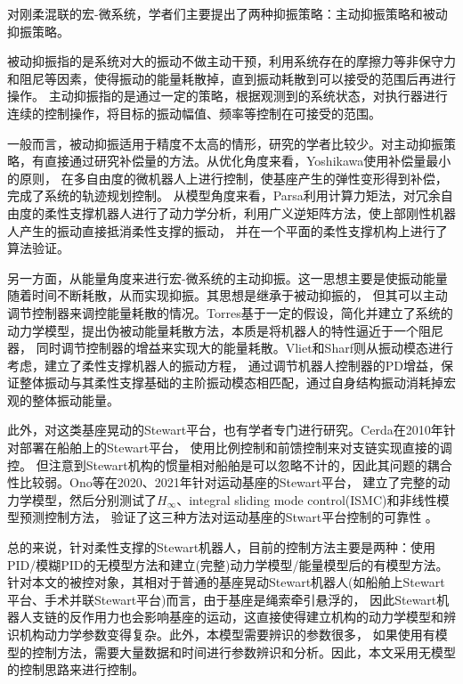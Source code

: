对刚柔混联的宏-微系统，学者们主要提出了两种抑振策略：主动抑振策略和被动抑振策略。

被动抑振指的是系统对大的振动不做主动干预，利用系统存在的摩擦力等非保守力和阻尼等因素，使得振动的能量耗散掉，直到振动耗散到可以接受的范围后再进行操作。
主动抑振指的是通过一定的策略，根据观测到的系统状态，对执行器进行连续的控制操作，将目标的振动幅值、频率等控制在可接受的范围。

一般而言，被动抑振适用于精度不太高的情形，研究的学者比较少。对主动抑振策略，有直接通过研究补偿量的方法。从优化角度来看，Yoshikawa使用补偿量最小的原则，
在多自由度的微机器人上进行控制，使基座产生的弹性变形得到补偿，完成了系统的轨迹规划控制\cite{yoshikawaQuasistaticTrajectoryTracking1993}。
从模型角度来看，Parsa利用计算力矩法，对冗余自由度的柔性支撑机器人进行了动力学分析，利用广义逆矩阵方法，使上部刚性机器人产生的振动直接抵消柔性支撑的振动，
并在一个平面的柔性支撑机构上进行了算法验证\cite{parsaControlMacroMicroManipulators2005}。

另一方面，从能量角度来进行宏-微系统的主动抑振。这一思想主要是使振动能量随着时间不断耗散，从而实现抑振。其思想是继承于被动抑振的，
但其可以主动调节控制器来调控能量耗散的情况。Torres基于一定的假设，简化并建立了系统的动力学模型，提出伪被动能量耗散方法，本质是将机器人的特性逼近于一个阻尼器，
同时调节控制器的增益来实现大的能量耗散\cite{torresVibrationControlDeployment1996}。Vliet和Sharf则从振动模态进行考虑，建立了柔性支撑机器人的振动方程，
通过调节机器人控制器的PD增益，保证整体振动与其柔性支撑基础的主阶振动模态相匹配，通过自身结构振动消耗掉宏观的整体振动能量\cite{vlietFrequencyMatchingAlgorithm1998}。

此外，对这类基座晃动的Stewart平台，也有学者专门进行研究。Cerda在2010年针对部署在船舶上的Stewart平台，
使用比例控制和前馈控制来对支链实现直接的调控\cite{cerdasalzmannAmpelmannDevelopmentAccess2010}。
但注意到Stewart机构的惯量相对船舶是可以忽略不计的，因此其问题的耦合性比较弱。Ono等在2020、2021年针对运动基座的Stewart平台，
建立了完整的动力学模型，然后分别测试了$H_{\infty}$、integral sliding mode control(ISMC)和非线性模型预测控制方法，
验证了这三种方法对运动基座的Stwart平台控制的可靠性\cite{onoDevelopmentEquationsMotion2019}\cite{onoControlSimulationsStewart2020}
\cite{onoNonlinearModelPredictive2021}。

总的来说，针对柔性支撑的Stewart机器人，目前的控制方法主要是两种：使用PID/模糊PID的无模型方法和建立(完整)动力学模型/能量模型后的有模型方法。
针对本文的被控对象，其相对于普通的基座晃动Stewart机器人(如船舶上Stewart平台、手术并联Stewart平台)而言，由于基座是绳索牵引悬浮的，
因此Stewart机器人支链的反作用力也会影响基座的运动，这直接使得建立机构的动力学模型和辨识机构动力学参数变得复杂。此外，本模型需要辨识的参数很多，
如果使用有模型的控制方法，需要大量数据和时间进行参数辨识和分析。因此，本文采用无模型的控制思路来进行控制。

\FloatBarrier